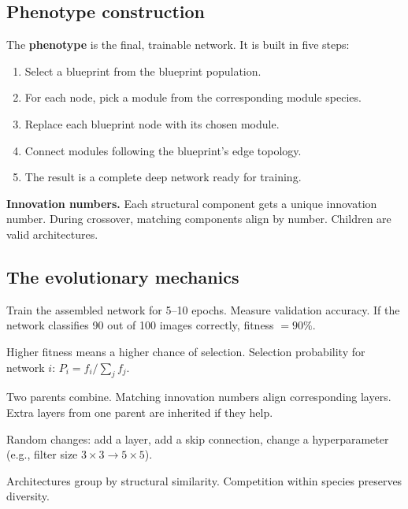\documentclass[a4paper,11pt]{article}
\newcommand{\vocab}[1]{\textbf{\color{navy}#1}}
\begin{document}
\subsection{Phenotype construction}

The \vocab{phenotype} is the final, trainable network.
It is built in five steps:

\begin{enumerate}
  \item Select a blueprint from the blueprint population.
  \item For each node, pick a module from the corresponding module species.
  \item Replace each blueprint node with its chosen module.
  \item Connect modules following the blueprint's edge topology.
  \item The result is a complete deep network ready for training.
\end{enumerate}

\noindent\textbf{Innovation numbers.}
Each structural component gets a unique innovation number.
During crossover, matching components align by number.
Children are valid architectures.

\subsection{The evolutionary mechanics}

\begin{description}[leftmargin=6em,style=nextline,font=\normalfont\bfseries\color{navy}]
  \item[Fitness] Train the assembled network for 5--10 epochs.
    Measure validation accuracy.
    If the network classifies 90 out of 100 images correctly,
    fitness $= 90\%$.
  \item[Selection] Higher fitness means a higher chance of selection.
    Selection probability for network $i$:
    $P_i = f_i / \sum_j f_j$.
  \item[Crossover] Two parents combine.
    Matching innovation numbers align corresponding layers.
    Extra layers from one parent are inherited if they help.
  \item[Mutation] Random changes: add a layer, add a skip connection,
    change a hyperparameter (e.g., filter size $3\times3 \to 5\times5$).
  \item[Speciation] Architectures group by structural similarity.
    Competition within species preserves diversity.
\end{description}
\end{document}
